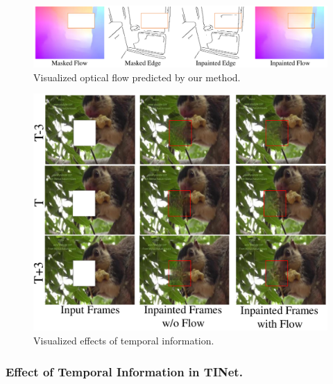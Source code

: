 \begin{figure}[t]
	\centering
	\includegraphics[width=1.0\columnwidth]{flowvis} %
	\caption{Visualized optical flow predicted by our method.}
	\label{flowvis}
\end{figure}
\begin{figure}[t]
	\centering
	\includegraphics[width=1.0\columnwidth]{flow_vis} %
	\caption{Visualized effects of temporal information.}
	\label{flow_vis}
\end{figure}

\subsubsection{Effect of Temporal Information in TINet.}

